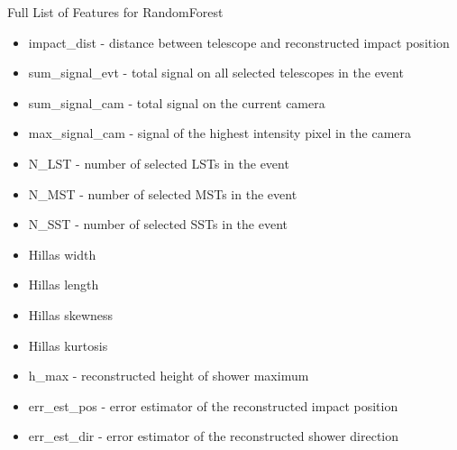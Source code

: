 \documentclass[8pt]{beamer}
\begin{document}
    \begin{frame}{Full List of Features for RandomForest}
        \begin{itemize}
         \item impact\_dist - distance between telescope and reconstructed impact position
         \item sum\_signal\_evt - total signal on all selected telescopes in the event
         \item sum\_signal\_cam - total signal on the current camera
         \item max\_signal\_cam - signal of the highest intensity pixel in the camera
         \item N\_LST - number of selected LSTs in the event
         \item N\_MST - number of selected MSTs in the event
         \item N\_SST - number of selected SSTs in the event
         \item Hillas width
         \item Hillas length
         \item Hillas skewness
         \item Hillas kurtosis
         \item h\_max - reconstructed height of shower maximum
         \item err\_est\_pos - error estimator of the reconstructed impact position
         \item err\_est\_dir - error estimator of the reconstructed shower direction
        \end{itemize}


    \end{frame}
\end{document}
